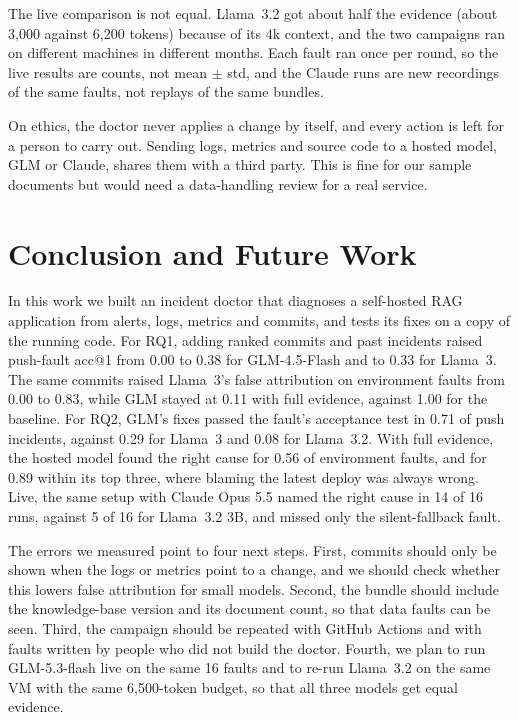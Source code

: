 \documentclass[12pt,onecolumn,draftclsnofoot]{IEEEtran}
\begin{document}
The live comparison is not equal. Llama~3.2 got about half the evidence (about 3,000 against 6,200 tokens) because of its 4k context, and the two campaigns ran on different machines in different months. Each fault ran once per round, so the live results are counts, not mean $\pm$ std, and the Claude runs are new recordings of the same faults, not replays of the same bundles.

On ethics, the doctor never applies a change by itself, and every action is left for a person to carry out. Sending logs, metrics and source code to a hosted model, GLM or Claude, shares them with a third party. This is fine for our sample documents but would need a data-handling review for a real service.

\section{Conclusion and Future Work}\label{sec:conclusion}

In this work we built an incident doctor that diagnoses a self-hosted RAG application from alerts, logs, metrics and commits, and tests its fixes on a copy of the running code. For RQ1, adding ranked commits and past incidents raised push-fault acc@1 from 0.00 to 0.38 for GLM-4.5-Flash and to 0.33 for Llama~3. The same commits raised Llama~3's false attribution on environment faults from 0.00 to 0.83, while GLM stayed at 0.11 with full evidence, against 1.00 for the baseline. For RQ2, GLM's fixes passed the fault's acceptance test in 0.71 of push incidents, against 0.29 for Llama~3 and 0.08 for Llama~3.2. With full evidence, the hosted model found the right cause for 0.56 of environment faults, and for 0.89 within its top three, where blaming the latest deploy was always wrong. Live, the same setup with Claude Opus 5.5 named the right cause in 14 of 16 runs, against 5 of 16 for Llama~3.2 3B, and missed only the silent-fallback fault.

The errors we measured point to four next steps. First, commits should only be shown when the logs or metrics point to a change, and we should check whether this lowers false attribution for small models. Second, the bundle should include the knowledge-base version and its document count, so that data faults can be seen. Third, the campaign should be repeated with GitHub Actions and with faults written by people who did not build the doctor. Fourth, we plan to run GLM-5.3-flash live on the same 16 faults and to re-run Llama~3.2 on the same VM with the same 6,500-token budget, so that all three models get equal evidence.
\end{document}
